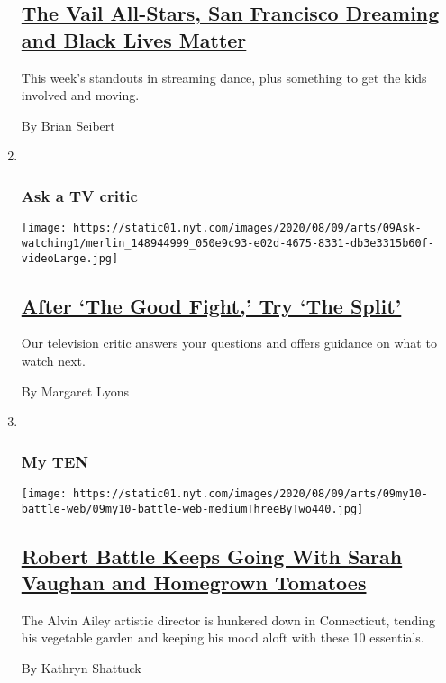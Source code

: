 \begin{enumerate}
{  \subsection{\texorpdfstring{\href{/2020/08/04/arts/dance/the-best-in-streaming-dance.html}{The
  Vail All-Stars, San Francisco Dreaming and Black Lives
  Matter}}{The Vail All-Stars, San Francisco Dreaming and Black Lives Matter}}\label{the-vail-all-stars-san-francisco-dreaming-and-black-lives-matter}}

  This week's standouts in streaming dance, plus something to get the
  kids involved and moving.

  By Brian Seibert
\item ~
  \hypertarget{ask-a-tv-critic}{%
  \subsubsection{Ask a TV critic}\label{ask-a-tv-critic}}

  \texttt{[image: https://static01.nyt.com/images/2020/08/09/arts/09Ask-watching1/merlin\_148944999\_050e9c93-e02d-4675-8331-db3e3315b60f-videoLarge.jpg]}

  \hypertarget{after-the-good-fight-try-the-split}{%
  \subsection{\texorpdfstring{\href{/2020/08/04/arts/television/the-good-fight-the-split.html}{After
  `The Good Fight,' Try `The
  Split'}}{After `The Good Fight,' Try `The Split'}}\label{after-the-good-fight-try-the-split}}

  Our television critic answers your questions and offers guidance on
  what to watch next.

  By Margaret Lyons
\item ~
  \hypertarget{my-ten}{%
  \subsubsection{My TEN}\label{my-ten}}

  \texttt{[image: https://static01.nyt.com/images/2020/08/09/arts/09my10-battle-web/09my10-battle-web-mediumThreeByTwo440.jpg]}

  \hypertarget{robert-battle-keeps-going-with-sarah-vaughan-and-homegrown-tomatoes}{%
  \subsection{\texorpdfstring{\href{/2020/08/04/arts/dance/robert-battle-favorites.html}{Robert
  Battle Keeps Going With Sarah Vaughan and Homegrown
  Tomatoes}}{Robert Battle Keeps Going With Sarah Vaughan and Homegrown Tomatoes}}\label{robert-battle-keeps-going-with-sarah-vaughan-and-homegrown-tomatoes}}

  The Alvin Ailey artistic director is hunkered down in Connecticut,
  tending his vegetable garden and keeping his mood aloft with these 10
  essentials.

  By Kathryn Shattuck
\end{enumerate}

